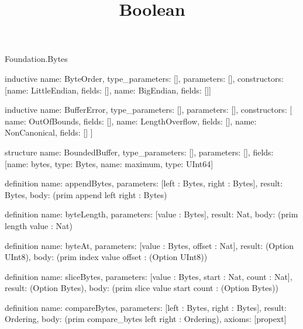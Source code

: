 \begin{lexlean}{Foundation.Bytes}
\title{Boolean}
\begin{semanticmodule}
inductive{
  name: ByteOrder,
  type_parameters: [],
  parameters: [],
  constructors: [{name: LittleEndian, fields: []}, {name: BigEndian, fields: []}]
}

inductive{
  name: BufferError,
  type_parameters: [],
  parameters: [],
  constructors: [
    {name: OutOfBounds, fields: []},
    {name: LengthOverflow, fields: []},
    {name: NonCanonical, fields: []}
  ]
}

structure{
  name: BoundedBuffer,
  type_parameters: [],
  parameters: [],
  fields: [{name: bytes, type: Bytes}, {name: maximum, type: UInt64}]
}

definition{
  name: appendBytes,
  parameters: [left : Bytes, right : Bytes],
  result: Bytes,
  body: (prim append left right : Bytes)
}

definition{
  name: byteLength,
  parameters: [value : Bytes],
  result: Nat,
  body: (prim length value : Nat)
}

definition{
  name: byteAt,
  parameters: [value : Bytes, offset : Nat],
  result: (Option UInt8),
  body: (prim index value offset : (Option UInt8))
}

definition{
  name: sliceBytes,
  parameters: [value : Bytes, start : Nat, count : Nat],
  result: (Option Bytes),
  body: (prim slice value start count : (Option Bytes))
}

definition{
  name: compareBytes,
  parameters: [left : Bytes, right : Bytes],
  result: Ordering,
  body: (prim compare_bytes left right : Ordering),
  axioms: [propext]
}
\end{semanticmodule}
\end{lexlean}
